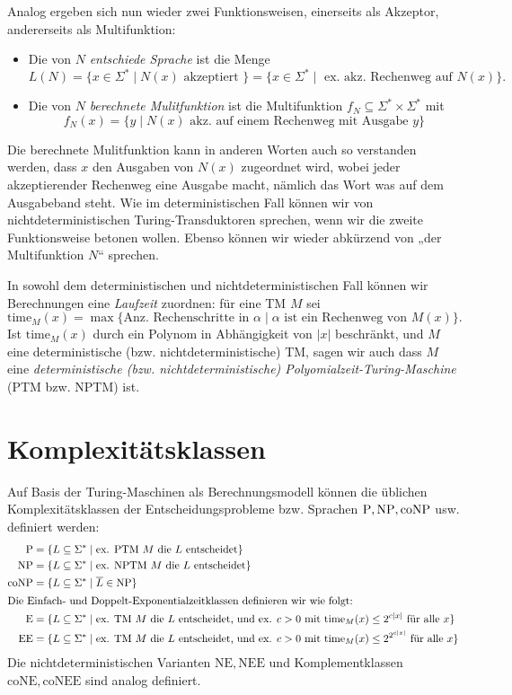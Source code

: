 Analog ergeben sich nun wieder zwei Funktionsweisen, einerseits als Akzeptor, andererseits als Multifunktion:
\begin{itemize}
    \item Die von $N$ \emph{entschiede  Sprache} ist die Menge \[ L(N)=\{ x\in\Sigma^* \mid N(x) \text{ akzeptiert } \} = \{ x\in\Sigma^* \mid \text{ ex. akz. Rechenweg auf $N(x)$} \}. \]
    \item Die von $N$ \emph{berechnete Mulitfunktion} ist die Multifunktion $f_N\subseteq\Sigma^*\times\Sigma^*$ mit
        \[ f_N(x) = \{ y \mid \text{$N(x)$ akz. auf einem Rechenweg mit Ausgabe $y$} \}  \] 
\end{itemize}
Die berechnete Mulitfunktion kann in anderen Worten auch so verstanden werden, dass $x$ den Ausgaben von $N(x)$ zugeordnet wird, wobei jeder akzeptierender Rechenweg eine Ausgabe macht, nämlich das Wort was auf dem Ausgabeband steht.
Wie im deterministischen Fall können wir von nichtdeterministischen Turing-Transduktoren sprechen, wenn wir die zweite Funktionsweise betonen wollen. Ebenso können wir wieder abkürzend von „der Multifunktion $N$“ sprechen.

In sowohl dem deterministischen und nichtdeterministischen Fall können wir Berechnungen eine \emph{Laufzeit} zuordnen: für eine TM $M$ sei
\[ \mathrm{time}_M(x) = \max \{ \text{Anz. Rechenschritte in $\alpha$} \mid \text{$\alpha$ ist ein Rechenweg von $M(x)$}  \}. \]
Ist $\mathrm{time}_M(x)$ durch ein Polynom in Abhängigkeit von $|x|$ beschränkt, und $M$ eine deterministische (bzw. nichtdeterministische) TM, sagen wir auch dass $M$ eine \emph{deterministische (bzw. nichtdeterministische) Polyomialzeit-Turing-Maschine} (PTM bzw. NPTM) ist. 


\section{Komplexitätsklassen}\label{sec:prelim-klassen}

Auf Basis der Turing-Maschinen als Berechnungsmodell können die üblichen Komplexitätsklassen der Entscheidungsprobleme bzw. Sprachen $\mathrm{P}, \mathrm{NP}, \mathrm{coNP}$ usw. definiert werden:
\begin{align*}
    \mathrm{P} &= \{ L\subseteq\Sigma^* \mid \text{ex. PTM $M$ die $L$ entscheidet} \}\\
    \mathrm{NP} &= \{ L\subseteq\Sigma^* \mid \text{ex. NPTM $M$ die $L$ entscheidet} \}\\
    \mathrm{coNP} &= \{ L\subseteq\Sigma^* \mid \overline{L}\in\mathrm{NP} \}\\
\intertext{Die Einfach- und Doppelt-Exponentialzeitklassen definieren wir wie folgt:}
    \mathrm{E} &= \{ L\subseteq\Sigma^* \mid \text{ex. TM $M$ die $L$ entscheidet, und ex. $c>0$ mit $\mathrm{time}_M(x) \leq 2^{c|x|}$ für alle $x$} \}\\
    \mathrm{EE} &= \{ L\subseteq\Sigma^* \mid \text{ex. TM $M$ die $L$ entscheidet, und ex. $c>0$ mit $\mathrm{time}_M(x) \leq 2^{2^{c|x|}}$ für alle $x$} \}
\end{align*}
Die nichtdeterministischen Varianten $\mathrm{NE}, \mathrm{NEE}$ und Komplementklassen $\mathrm{coNE}, \mathrm{coNEE}$ sind analog definiert.

